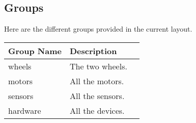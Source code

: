 \subsection{Groups}
Here are the different groups provided in the current layout.

\begin{tabular}{|l|l|l|}
  \hline
  Group Name & Description     \\
  \hline
  wheels     & The two wheels. \\
  motors     & All the motors. \\
  sensors    & All the sensors.\\
  hardware   & All the devices.\\
  \hline
\end{tabular}


